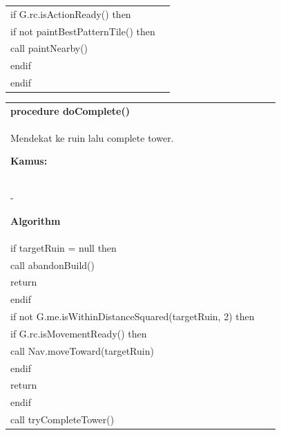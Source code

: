 \documentclass{article}
\newenvironment{pseudobox}
{
\centering
\begin{longtable}{|p{0.94\linewidth}|}
\hline
}
{
\\ \hline
\end{longtable}
\vspace{0.05cm}
}
\begin{document}
\begin{pseudobox}
\hspace*{1em} if G.rc.isActionReady() then \\
\hspace*{2em} if not paintBestPatternTile() then \\
\hspace*{3em} call paintNearby() \\
\hspace*{2em} endif \\
\hspace*{1em} endif
\end{pseudobox}

\begin{pseudobox}
\textbf{procedure doComplete()} \\
{ Mendekat ke ruin lalu complete tower. }

\textbf{Kamus:} \\
\hspace*{1em} -

\textbf{Algorithm} \\
\hspace*{1em} if targetRuin = null then \\
\hspace*{2em} call abandonBuild() \\
\hspace*{2em} return \\
\hspace*{1em} endif \\

\hspace*{1em} if not G.me.isWithinDistanceSquared(targetRuin, 2) then \\
\hspace*{2em} if G.rc.isMovementReady() then \\
\hspace*{3em} call Nav.moveToward(targetRuin) \\
\hspace*{2em} endif \\
\hspace*{2em} return \\
\hspace*{1em} endif \\

\hspace*{1em} call tryCompleteTower()
\end{pseudobox}
\end{document}
